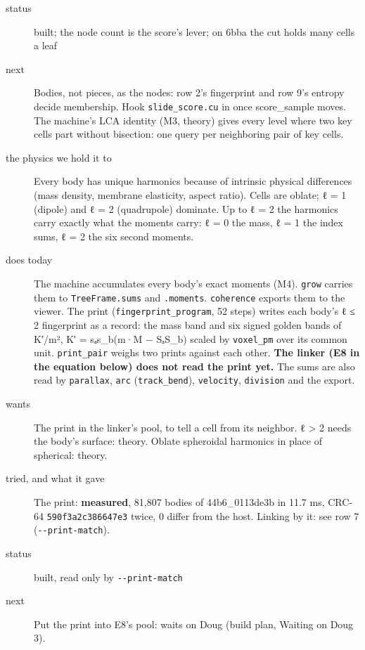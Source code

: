 \begin{description}
\item[{status}] built; the node count is the score's lever; on 6bba the cut holds many cells a leaf
\item[{next}] Bodies, not pieces, as the nodes: row 2's fingerprint and row 9's entropy decide membership. Hook \texttt{slide\_\allowbreak{}score.\allowbreak{}cu} in once score\_\allowbreak{}sample moves. The machine's LCA identity (M3, theory) gives every level where two key cells part without bisection: one query per neighboring pair of key cells.
\end{description}

\begin{description}
\item[{the physics we hold it to}] Every body has unique harmonics because of intrinsic physical differences (mass density, membrane elasticity, aspect ratio). Cells are oblate; ℓ = 1 (dipole) and ℓ = 2 (quadrupole) dominate. Up to ℓ = 2 the harmonics carry exactly what the moments carry: ℓ = 0 the mass, ℓ = 1 the index sums, ℓ = 2 the six second moments.
\item[{does today}] The machine accumulates every body's exact moments (M4). \texttt{grow} carries them to \texttt{Tree\allowbreak{}Frame.\allowbreak{}sums} and \texttt{.\allowbreak{}moments}. \texttt{coherence} exports them to the viewer. The print (\texttt{fingerprint\_\allowbreak{}program}, 52 steps) writes each body's ℓ ≤ 2 fingerprint as a record: the mass band and six signed golden bands of K′/m², K′ = sₐs\_\allowbreak{}b(m·M − SₐS\_\allowbreak{}b) scaled by \texttt{voxel\_\allowbreak{}pm} over its common unit. \texttt{print\_\allowbreak{}pair} weighs two prints against each other. \textbf{The linker (E8 in the equation below) does not read the print yet.} The sums are also read by \texttt{parallax}, \texttt{arc} (\texttt{track\_\allowbreak{}bend}), \texttt{velocity}, \texttt{division} and the export.
\item[{wants}] The print in the linker's pool, to tell a cell from its neighbor. ℓ > 2 needs the body's surface: theory. Oblate spheroidal harmonics in place of spherical: theory.
\item[{tried, and what it gave}] The print: \textbf{measured}, 81,807 bodies of 44b6\_\allowbreak{}0113de3b in 11.7 ms, CRC-64 \texttt{590f3a2c386647e3} twice, 0 differ from the host. Linking by it: see row 7 (\texttt{-\allowbreak{}-\allowbreak{}print-\allowbreak{}match}).
\item[{status}] built, read only by \texttt{-\allowbreak{}-\allowbreak{}print-\allowbreak{}match}
\item[{next}] Put the print into E8's pool: waits on Doug (build plan, Waiting on Doug 3).
\end{description}

